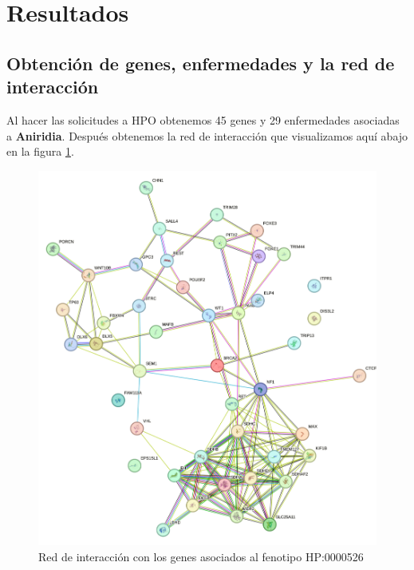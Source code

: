 \section{Resultados}

\subsection{Obtención de genes, enfermedades y la red de interacción}
Al hacer las solicitudes a HPO obtenemos 45 genes y 29 enfermedades asociadas a \textbf{Aniridia}. Después obtenemos la red de interacción que visualizamos aquí abajo en la figura \ref{fig:m}.

\begin{figure}[h] %
	\centering
	\includegraphics[width=1\textwidth]{figures/red_interaccion_aniridia.png} %
	\caption{Red de interacción con los genes asociados al fenotipo HP:0000526} %
	\label{fig:m}
\end{figure}

